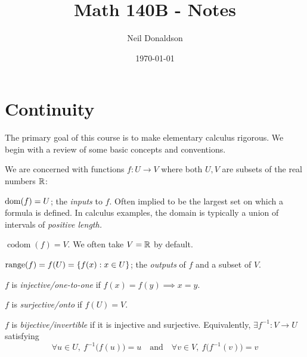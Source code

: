 \graphicspath{{1contrev/asy/}}

\title{Math 140B - Notes}
\author{Neil Donaldson}
\date{\today}
\maketitle

\thispagestyle{empty}

\section{Continuity}

The primary goal of this course is to make elementary calculus rigorous. We begin with a review of some basic concepts and conventions.



% 



We are concerned with functions $f:U\to V$ where both $U,V$ are subsets of the real numbers $\mathbb{R}$:
\begin{description}\itemsep=3pt\parsep=3pt
	\item[\normalfont\emph{Domain}] $\operatorname{dom}(f)=U$; the \emph{inputs} to $f$. Often implied to be the largest set on which a formula is defined. In calculus examples, the domain is typically a union of intervals of \emph{positive length.}
	\item[\normalfont\emph{Codomain}] $\operatorname{codom}(f)=V$. We often take $V=\mathbb{R}$ by default.
	\item[\normalfont\emph{Range}] $\operatorname{range}(f)=f(U)=\{f(x):x\in U\}$; the \emph{outputs} of $f$ and a subset of $V$.
	\item[\normalfont\emph{Injectivity}] $f$ is \emph{injective/one-to-one} if $f(x)=f(y)\implies x=y$.
	\item[\normalfont\emph{Surjectivity}] $f$ is \emph{surjective/onto} if $f(U)=V$.
	\item[\normalfont\emph{Inverses}] $f$ is \emph{bijective/invertible} if it is injective and surjective. Equivalently, $\exists f^{-1}:V\to U$ satisfying
	\[\forall u\in U,\ f^{-1}\bigl(f(u)\bigr)=u\quad\text{and}\quad \forall v\in V,\ f\bigl(f^{-1}(v)\bigr)=v\]
\end{description}

